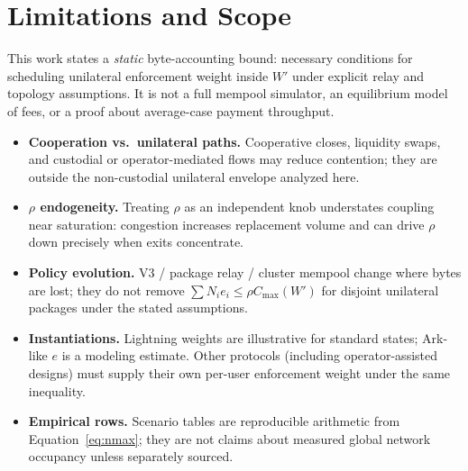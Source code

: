 \documentclass{article}
\theoremstyle{definition}
\begin{document}
\section{Limitations and Scope}
This work states a \emph{static} byte-accounting bound: necessary conditions for scheduling unilateral enforcement weight inside $W'$ under explicit relay and topology assumptions. It is not a full mempool simulator, an equilibrium model of fees, or a proof about average-case payment throughput.
\begin{itemize}
    \itemsep0em
    \item \textbf{Cooperation vs.\ unilateral paths.} Cooperative closes, liquidity swaps, and custodial or operator-mediated flows may reduce contention; they are outside the non-custodial unilateral envelope analyzed here.
    \item \textbf{$\rho$ endogeneity.} Treating $\rho$ as an independent knob understates coupling near saturation: congestion increases replacement volume and can drive $\rho$ down precisely when exits concentrate.
    \item \textbf{Policy evolution.} V3 / package relay / cluster mempool change where bytes are lost; they do not remove $\sum N_i e_i \le \rho C_{\max}(W')$ for disjoint unilateral packages under the stated assumptions.
    \item \textbf{Instantiations.} Lightning weights are illustrative for standard states; Ark-like $e$ is a modeling estimate. Other protocols (including operator-assisted designs) must supply their own per-user enforcement weight under the same inequality.
    \item \textbf{Empirical rows.} Scenario tables are reproducible arithmetic from Equation~\eqref{eq:nmax}; they are not claims about measured global network occupancy unless separately sourced.
\end{itemize}
\end{document}
